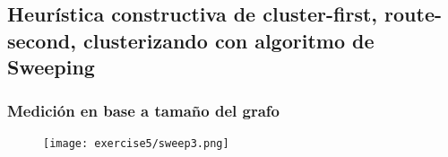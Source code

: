 \subsection{Heurística constructiva de cluster-first, route-second, clusterizando con algoritmo de Sweeping}

\subsubsection{Medición en base a tamaño del grafo}

\begin{figure}[H]
	\centering
	\texttt{[image: exercise5/sweep3.png]}
\end{figure}
